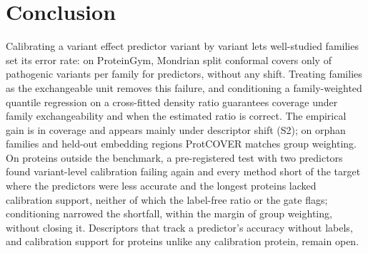 \section{Conclusion}\label{sec:conclusion}

Calibrating a variant effect predictor variant by variant lets well-studied families set its error rate: on ProteinGym, Mondrian split conformal covers only \sOneBtwoPath{} of pathogenic variants per family for \sOneBtwoNBelow{} predictors, without any shift. Treating families as the exchangeable unit removes this failure, and conditioning a family-weighted quantile regression on a cross-fitted density ratio guarantees coverage under family exchangeability and when the estimated ratio is correct. The empirical gain is in coverage and appears mainly under descriptor shift (S2); on orphan families and held-out embedding regions ProtCOVER matches group weighting. On proteins outside the benchmark, a pre-registered test with two predictors found variant-level calibration failing again and every method short of the target where the predictors were less accurate and the longest proteins lacked calibration support, neither of which the label-free ratio or the gate flags; conditioning narrowed the shortfall, within the margin of group weighting, without closing it. Descriptors that track a predictor's accuracy without labels, and calibration support for proteins unlike any calibration protein, remain open.
